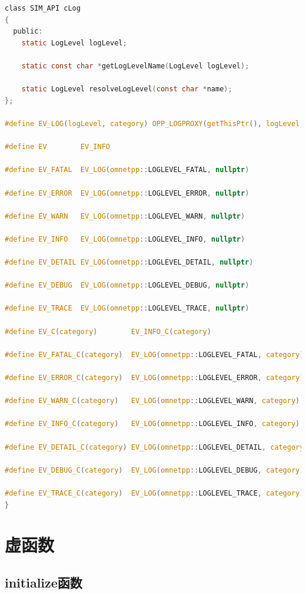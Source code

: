 \begin{lstlisting}[language=c]
class SIM_API cLog
{
  public:
    static LogLevel logLevel;

    static const char *getLogLevelName(LogLevel logLevel);

    static LogLevel resolveLogLevel(const char *name);
};

#define EV_LOG(logLevel, category) OPP_LOGPROXY(getThisPtr(), logLevel, category).getStream()

#define EV        EV_INFO

#define EV_FATAL  EV_LOG(omnetpp::LOGLEVEL_FATAL, nullptr)

#define EV_ERROR  EV_LOG(omnetpp::LOGLEVEL_ERROR, nullptr)

#define EV_WARN   EV_LOG(omnetpp::LOGLEVEL_WARN, nullptr)

#define EV_INFO   EV_LOG(omnetpp::LOGLEVEL_INFO, nullptr)

#define EV_DETAIL EV_LOG(omnetpp::LOGLEVEL_DETAIL, nullptr)

#define EV_DEBUG  EV_LOG(omnetpp::LOGLEVEL_DEBUG, nullptr)

#define EV_TRACE  EV_LOG(omnetpp::LOGLEVEL_TRACE, nullptr)

#define EV_C(category)        EV_INFO_C(category)

#define EV_FATAL_C(category)  EV_LOG(omnetpp::LOGLEVEL_FATAL, category)

#define EV_ERROR_C(category)  EV_LOG(omnetpp::LOGLEVEL_ERROR, category)

#define EV_WARN_C(category)   EV_LOG(omnetpp::LOGLEVEL_WARN, category)

#define EV_INFO_C(category)   EV_LOG(omnetpp::LOGLEVEL_INFO, category)

#define EV_DETAIL_C(category) EV_LOG(omnetpp::LOGLEVEL_DETAIL, category)

#define EV_DEBUG_C(category)  EV_LOG(omnetpp::LOGLEVEL_DEBUG, category)

#define EV_TRACE_C(category)  EV_LOG(omnetpp::LOGLEVEL_TRACE, category)
}
\end{lstlisting}

\section{虚函数}
\label{虚函数}

\subsection{initialize函数}
\label{initialize函数}


